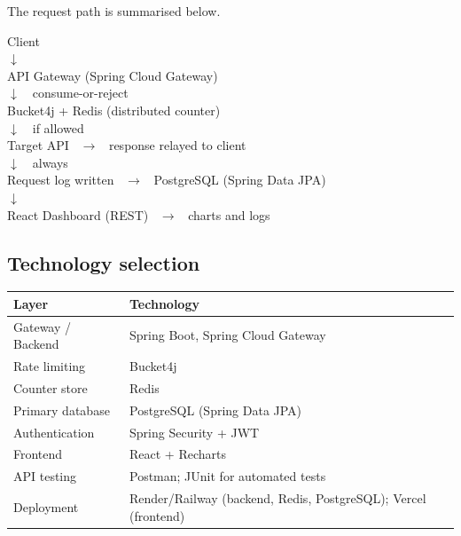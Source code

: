 \documentclass[11pt,a4paper]{article}
\begin{document}
\noindent The request path is summarised below.

\begin{center}
\begin{minipage}{0.92\textwidth}
\ttfamily\small
Client\\
\quad$\downarrow$\\
API Gateway (Spring Cloud Gateway)\\
\quad$\downarrow$\ \ consume-or-reject\\
Bucket4j + Redis (distributed counter)\\
\quad$\downarrow$\ \ if allowed\\
Target API \ $\longrightarrow$ \ response relayed to client\\
\quad$\downarrow$\ \ always\\
Request log written \ $\longrightarrow$ \ PostgreSQL (Spring Data JPA)\\
\quad$\downarrow$\\
React Dashboard (REST) \ $\longrightarrow$ \ charts and logs
\end{minipage}
\end{center}

\subsection{Technology selection}
\begin{center}
\begin{tabular}{@{}>{\raggedright\arraybackslash}p{}>{\raggedright\arraybackslash}p{}@{}}
\toprule
\textbf{Layer} & \textbf{Technology} \\
\midrule
Gateway / Backend        & Spring Boot, Spring Cloud Gateway \\
Rate limiting            & Bucket4j \\
Counter store            & Redis \\
Primary database         & PostgreSQL (Spring Data JPA) \\
Authentication           & Spring Security + JWT \\
Frontend                 & React + Recharts \\
API testing              & Postman; JUnit for automated tests \\
Deployment               & Render/Railway (backend, Redis, PostgreSQL); Vercel (frontend) \\
\bottomrule
\end{tabular}
\end{center}
\end{document}

